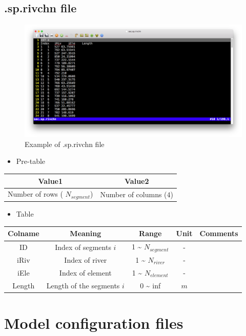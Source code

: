 \documentclass[]{scrbook}
\providecommand{\tightlist}{%
  \setlength{\itemsep}{0pt}\setlength{\parskip}{0pt}}
\begin{document}
\subsection{.sp.rivchn file}\label{sp.rivchn-file}

\begin{figure}
\centering
\includegraphics{Fig/IO/sp.rivchn.png}
\caption{Example of .sp.rivchn file}
\end{figure}

\begin{itemize}
\tightlist
\item
  Pre-table
\end{itemize}

\begin{longtable}[]{@{}cc@{}}
\toprule
Value1 & Value2\tabularnewline
\midrule
\endhead
Number of rows ( \(N_{segment}\)) & Number of columns
(\(4\))\tabularnewline
\bottomrule
\end{longtable}

\begin{itemize}
\tightlist
\item
  Table
\end{itemize}

\begin{longtable}[]{@{}ccccc@{}}
\toprule
Colname & Meaning & Range & Unit & Comments\tabularnewline
\midrule
\endhead
ID & Index of segments \(i\) & 1 \textasciitilde{} \(N_{segment}\) & -
&\tabularnewline
iRiv & Index of river & 1 \textasciitilde{} \(N_{river}\) & -
&\tabularnewline
iEle & Index of element & 1 \textasciitilde{} \(N_{element}\) & -
&\tabularnewline
Length & Length of the segments \(i\) & 0 \textasciitilde{} inf & \(m\)
&\tabularnewline
\bottomrule
\end{longtable}

\section{Model configuration files}\label{model-configuration-files}
\end{document}
